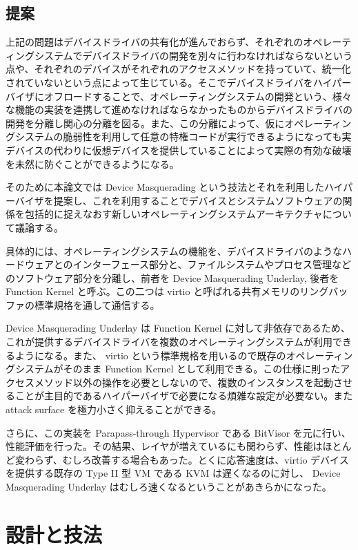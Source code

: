 \documentclass[a4paper,11pt,report]{ltjsbook}
\begin{document}
\section{提案}

上記の問題はデバイスドライバの共有化が進んでおらず、それぞれのオペレーティングシステムでデバイスドライバの開発を別々に行わなければならないという点や、それぞれのデバイスがそれぞれのアクセスメソッドを持っていて、統一化されていないという点によって生じている。そこでデバイスドライバをハイパーバイザにオフロードすることで、オペレーティングシステムの開発という、様々な機能の実装を連携して進めなければならなかったものからデバイスドライバの開発を分離し関心の分離を図る。また、この分離によって、仮にオペレーティングシステムの脆弱性を利用して任意の特権コードが実行できるようになっても実デバイスの代わりに仮想デバイスを提供していることによって実際の有効な破壊を未然に防ぐことができるようになる。

そのために本論文では Device Masquerading という技法とそれを利用したハイパーバイザを提案し、これを利用することでデバイスとシステムソフトウェアの関係を包括的に捉えなおす新しいオペレーティングシステムアーキテクチャについて議論する。

具体的には、オペレーティングシステムの機能を、デバイスドライバのようなハードウェアとのインターフェース部分と、ファイルシステムやプロセス管理などのソフトウェア部分を分離し、前者を Device Masquerading Underlay, 後者を Function Kernel と呼ぶ。この二つは virtio と呼ばれる共有メモリのリングバッファの標準規格を通して通信する。

Device Masquerading Underlay は Function Kernel に対して非依存であるため、これが提供するデバイスドライバを複数のオペレーティングシステムが利用できるようになる。また、 virtio という標準規格を用いるので既存のオペレーティングシステムがそのまま Function Kernel として利用できる。この仕様に則ったアクセスメソッド以外の操作を必要としないので、複数のインスタンスを起動させることが主目的であるハイパーバイザで必要になる煩雑な設定が必要ない。また attack surface を極力小さく抑えることができる。

さらに、この実装を Parapass-through Hypervisor である BitVisor を元に行い、性能評価を行った。その結果、レイヤが増えているにも関わらず、性能はほとんど変わらず、むしろ改善する場合もあった。とくに応答速度は、virtio デバイスを提供する既存の Type II 型 VM である KVM は遅くなるのに対し、 Device Masquerading Underlay はむしろ速くなるということがあきらかになった。

\chapter{設計と技法}
\end{document}
